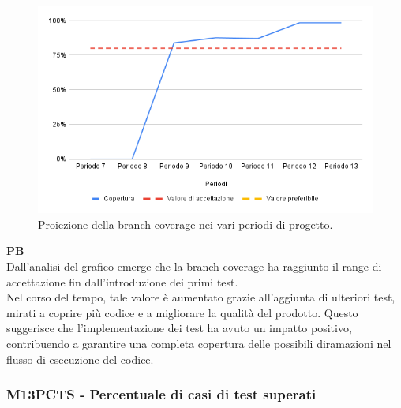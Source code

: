 \vspace{0.3cm}

\begin{figure}[H]
    \centering
    \includegraphics[width=1\textwidth]{../Images/PianoDiQualifica/M16BC.png}
    \caption{Proiezione della branch coverage nei vari periodi di progetto.}
    \label{fig:14}
\end{figure}

\vspace{0.2cm}

\textbf{PB} \\
Dall’analisi del grafico emerge che la branch coverage ha raggiunto il range di accettazione fin dall’introduzione dei primi test. \\
Nel corso del tempo, tale valore è aumentato grazie all’aggiunta di ulteriori test, mirati a coprire più codice e a migliorare la qualità del prodotto. Questo suggerisce che l’implementazione dei test ha avuto un impatto positivo, contribuendo a garantire una completa copertura delle possibili diramazioni nel flusso di esecuzione del codice.

\vspace{0.2cm}

\subsubsection{M13PCTS - Percentuale di casi di test superati}

\vspace{0.3cm}

